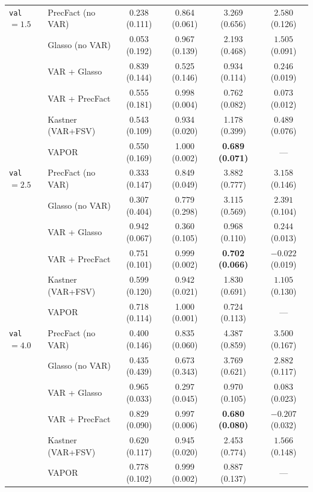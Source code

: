 \begin{table}[h!]
\begin{tabular}{llcccc}
\texttt{val} $= 1.5$ & PrecFact (no VAR)  & 0.238 (0.111) & 0.864 (0.061) & 3.269 (0.656) & $2.580$ (0.126) \\
                     & Glasso (no VAR)    & 0.053 (0.192) & 0.967 (0.139) & 2.193 (0.468) & $1.505$ (0.091) \\
                     & VAR + Glasso       & 0.839 (0.144) & 0.525 (0.146) & 0.934 (0.114) & $0.246$ (0.019) \\
                     & VAR + PrecFact     & 0.555 (0.181) & 0.998 (0.004) & 0.762 (0.082) & $0.073$ (0.012) \\
                     & Kastner (VAR+FSV)  & 0.543 (0.109) & 0.934 (0.020) & 1.178 (0.399) & $0.489$ (0.076) \\
                     & VAPOR              & 0.550 (0.169) & 1.000 (0.002) & \textbf{0.689 (0.071)} & --- \\
\midrule
\texttt{val} $= 2.5$ & PrecFact (no VAR)  & 0.333 (0.147) & 0.849 (0.049) & 3.882 (0.777) & $3.158$ (0.146) \\
                     & Glasso (no VAR)    & 0.307 (0.404) & 0.779 (0.298) & 3.115 (0.569) & $2.391$ (0.104) \\
                     & VAR + Glasso       & 0.942 (0.067) & 0.360 (0.105) & 0.968 (0.110) & $0.244$ (0.013) \\
                     & VAR + PrecFact     & 0.751 (0.101) & 0.999 (0.002) & \textbf{0.702 (0.066)} & $-0.022$ (0.019) \\
                     & Kastner (VAR+FSV)  & 0.599 (0.120) & 0.942 (0.021) & 1.830 (0.691) & $1.105$ (0.130) \\
                     & VAPOR              & 0.718 (0.114) & 1.000 (0.001) & 0.724 (0.113) & --- \\
\midrule
\texttt{val} $= 4.0$ & PrecFact (no VAR)  & 0.400 (0.146) & 0.835 (0.060) & 4.387 (0.859) & $3.500$ (0.167) \\
                     & Glasso (no VAR)    & 0.435 (0.439) & 0.673 (0.343) & 3.769 (0.621) & $2.882$ (0.117) \\
                     & VAR + Glasso       & 0.965 (0.033) & 0.297 (0.045) & 0.970 (0.105) & $0.083$ (0.023) \\
                     & VAR + PrecFact     & 0.829 (0.090) & 0.997 (0.006) & \textbf{0.680 (0.080)} & $-0.207$ (0.032) \\
                     & Kastner (VAR+FSV)  & 0.620 (0.117) & 0.945 (0.020) & 2.453 (0.774) & $1.566$ (0.148) \\
                     & VAPOR              & 0.778 (0.102) & 0.999 (0.002) & 0.887 (0.137) & --- \\
\bottomrule
\end{tabular}
\end{table}

